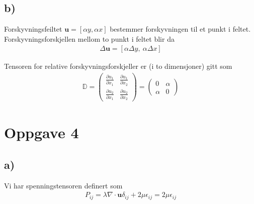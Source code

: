 \documentclass[12p,a4paper]{article}
\renewcommand{\b}{\boldsymbol}
\newcommand{\m}{\mathbb}
\begin{document}
\subsection*{b)}
Forskyvningsfeiltet $\b u = [\alpha y, \alpha x]$ bestemmer forskyvningen til et punkt i feltet. Forskyvningsforskjellen mellom to punkt i feltet blir da
\begin{align*}
    \Delta\b u = [\alpha\Delta y,\ \alpha\Delta x]
\end{align*}

Tensoren for relative forskyvningsforskjeller er (i to dimensjoner) gitt som
\begin{align*}
    \m D =
    \begin{pmatrix}
        \frac{\partial u_1}{\partial x_1} & \frac{\partial u_1}{\partial x_2} \\[0.5em]
        \frac{\partial u_2}{\partial x_1} & \frac{\partial u_2}{\partial x_2}
    \end{pmatrix}
    =
    \begin{pmatrix}
        0 & \alpha \\
        \alpha & 0
    \end{pmatrix}
\end{align*}


\section*{Oppgave 4}
\subsection*{a)}

Vi har spenningstensoren definert som
\begin{align}\label{eqn:Pij}
    P_{ij} = \lambda\nabla\cdot \b u \delta_{ij} +2\mu \epsilon_{ij} = 2\mu \epsilon_{ij}
\end{align}
\end{document}
